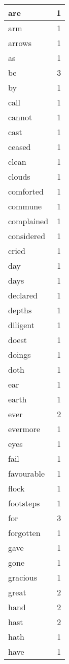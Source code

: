 \begin{center}
\begin{longtable}{l|r}
are & 1\\ \hline 
arm & 1\\ \hline 
arrows & 1\\ \hline 
as & 1\\ \hline 
be & 3\\ \hline 
by & 1\\ \hline 
call & 1\\ \hline 
cannot & 1\\ \hline 
cast & 1\\ \hline 
ceased & 1\\ \hline 
clean & 1\\ \hline 
clouds & 1\\ \hline 
comforted & 1\\ \hline 
commune & 1\\ \hline 
complained & 1\\ \hline 
considered & 1\\ \hline 
cried & 1\\ \hline 
day & 1\\ \hline 
days & 1\\ \hline 
declared & 1\\ \hline 
depths & 1\\ \hline 
diligent & 1\\ \hline 
doest & 1\\ \hline 
doings & 1\\ \hline 
doth & 1\\ \hline 
ear & 1\\ \hline 
earth & 1\\ \hline 
ever & 2\\ \hline 
evermore & 1\\ \hline 
eyes & 1\\ \hline 
fail & 1\\ \hline 
favourable & 1\\ \hline 
flock & 1\\ \hline 
footsteps & 1\\ \hline 
for & 3\\ \hline 
forgotten & 1\\ \hline 
gave & 1\\ \hline 
gone & 1\\ \hline 
gracious & 1\\ \hline 
great & 2\\ \hline 
hand & 2\\ \hline 
hast & 2\\ \hline 
hath & 1\\ \hline 
have & 1\\ \hline 

\end{longtable}
\end{center}
